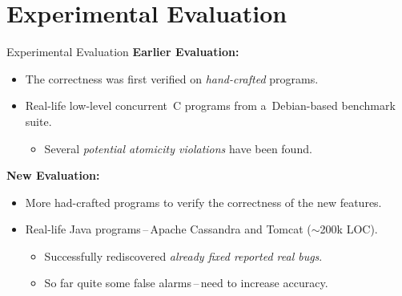 \documentclass[%
    10pt, xcolor=pdflatex, hyperref={unicode}, aspectratio=169%
]{beamer}
\begin{document}
\section{Experimental Evaluation}
\begin{frame}{Experimental Evaluation}
    \textbf{Earlier Evaluation:}
    \medskip
    \begin{itemize}\setlength\itemsep{1em}
        \item
            The \alert{correctness} was first verified on
            \emph{hand-crafted} programs.

        \item
            \alert{Real-life low-level concurrent~C} programs from
            a~Debian-based benchmark suite.

            \smallskip

            \begin{itemize}\setlength\itemsep{1em}
                \item
                    Several \emph{potential atomicity violations} have
                    been found.
            \end{itemize}
    \end{itemize}

    \bigskip

    \textbf{New Evaluation:}
    \medskip
    \begin{itemize}\setlength\itemsep{1em}
        \item
            More had-crafted programs to verify the correctness of
            the new features.

        \item
            \alert{Real-life Java} programs\,--\,\alert{Apache Cassandra}
            and \alert{Tomcat} ($ \sim $200k LOC).

            \smallskip

            \begin{itemize}\setlength\itemsep{1em}
                \item
                    Successfully rediscovered \emph{already fixed
                    reported real bugs}.

                \item
                    So far quite some \alert{false alarms}\,--\,need
                    to increase accuracy.
            \end{itemize}
    \end{itemize}
\end{frame}
\end{document}
